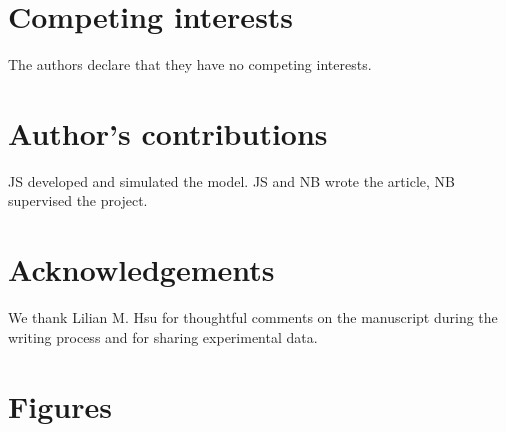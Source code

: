 \documentclass{bmcart}
\begin{document}
\begin{backmatter}

\section*{Competing interests}
  The authors declare that they have no competing interests.

\section*{Author's contributions}
   JS developed and simulated the model. JS and NB wrote the article, NB supervised the project. 

\section*{Acknowledgements}
We thank Lilian M. Hsu for thoughtful comments on the manuscript during the
writing process and for sharing experimental data.



\section*{Figures}


\end{backmatter}
\end{document}

